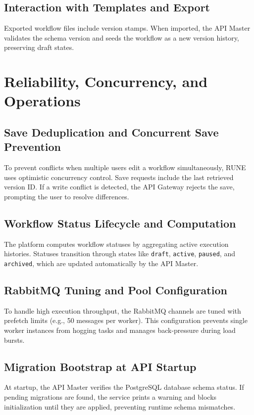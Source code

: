 \documentclass[12pt]{report}
\begin{document}
\section{Interaction with Templates and Export}
Exported workflow files include version stamps. When imported, the API Master validates the schema version and seeds the workflow as a new version history, preserving draft states.

\chapter{Reliability, Concurrency, and Operations}
\label{ch:reliability_operations}

\section{Save Deduplication and Concurrent Save Prevention}
To prevent conflicts when multiple users edit a workflow simultaneously, RUNE uses optimistic concurrency control. Save requests include the last retrieved version ID. If a write conflict is detected, the API Gateway rejects the save, prompting the user to resolve differences.

\section{Workflow Status Lifecycle and Computation}
The platform computes workflow statuses by aggregating active execution histories. Statuses transition through states like \texttt{draft}, \texttt{active}, \texttt{paused}, and \texttt{archived}, which are updated automatically by the API Master.

\section{RabbitMQ Tuning and Pool Configuration}
To handle high execution throughput, the RabbitMQ channels are tuned with prefetch limits (e.g., 50 messages per worker). This configuration prevents single worker instances from hogging tasks and manages back-pressure during load bursts.

\section{Migration Bootstrap at API Startup}
At startup, the API Master verifies the PostgreSQL database schema status. If pending migrations are found, the service prints a warning and blocks initialization until they are applied, preventing runtime schema mismatches.
\end{document}
